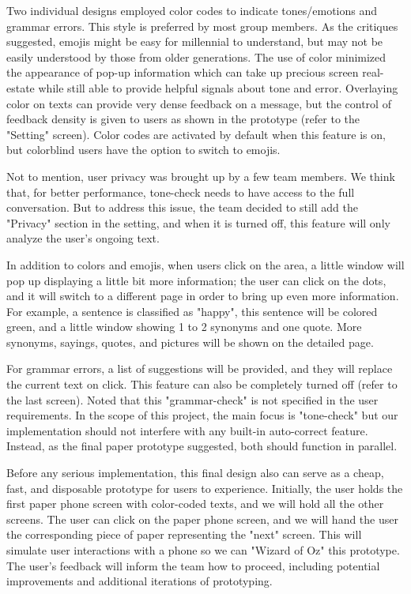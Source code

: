 \documentclass[acmsmall,screen,authorversion,nonacm]{acmart}
\begin{document}
Two individual designs employed color codes to indicate tones/emotions and grammar errors. This style is preferred by most group members. As the critiques suggested, emojis might be easy for millennial to understand, but may not be easily understood by those from older generations. The use of color minimized the appearance of pop-up information which can take up precious screen real-estate while still able to provide helpful signals about tone and error. Overlaying color on texts can provide very dense feedback on a message, but the control of feedback density is given to users as shown in the prototype (refer to the "Setting" screen). Color codes are activated by default when this feature is on, but colorblind users have the option to switch to emojis. 

Not to mention, user privacy was brought up by a few team members. We think that, for better performance, tone-check needs to have access to the full conversation. But to address this issue, the team decided to still add the "Privacy" section in the setting, and when it is turned off, this feature will only analyze the user's ongoing text. 

In addition to colors and emojis, when users click on the area, a little window will pop up displaying a little bit more information; the user can click on the dots, and it will switch to a different page in order to bring up even more information. For example, a sentence is classified as "happy", this sentence will be colored green, and a little window showing 1 to 2 synonyms and one quote. More synonyms, sayings, quotes, and pictures will be shown on the detailed page. 

For grammar errors, a list of suggestions will be provided, and they will replace the current text on click. This feature can also be completely turned off (refer to the last screen). Noted that this "grammar-check" is not specified in the user requirements. In the scope of this project, the main focus is "tone-check" but our implementation should not interfere with any built-in auto-correct feature. Instead, as the final paper prototype suggested, both should function in parallel. 

Before any serious implementation, this final design also can serve as a cheap, fast, and disposable prototype for users to experience. Initially, the user holds the first paper phone screen with color-coded texts, and we will hold all the other screens. The user can click on the paper phone screen, and we will hand the user the corresponding piece of paper representing the "next" screen. This will simulate user interactions with a phone so we can "Wizard of Oz" this prototype. The user's feedback will inform the team how to proceed, including potential improvements and additional iterations of prototyping. 
\end{document}
